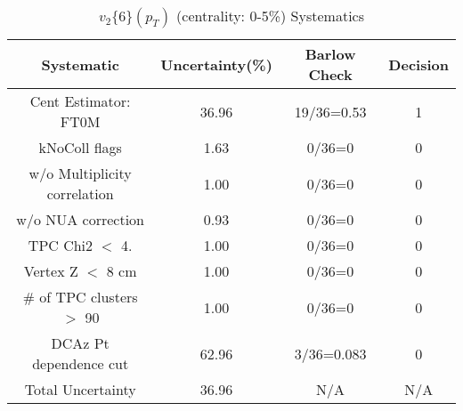 \begin{table}[htbp]
\caption{$v_2\{6\}(p_{T})$ (centrality: 0-5\%) Systematics}
\label{tab:Sys_pTDiffv26ChFull}
\centering
\begin{tabular}{|c|c|c|c|}
\hline
Systematic & Uncertainty(\%) & Barlow Check & Decision \\
\hline
Cent Estimator: FT0M & 36.96 & 19/36=0.53 & 1 \\
kNoColl flags & 1.63 & 0/36=0 & 0 \\
w/o Multiplicity correlation & 1.00 & 0/36=0 & 0 \\
w/o NUA correction & 0.93 & 0/36=0 & 0 \\
TPC Chi2 $<$ 4. & 1.00 & 0/36=0 & 0 \\
Vertex Z $<$ 8 cm & 1.00 & 0/36=0 & 0 \\
\# of TPC clusters $>$ 90 & 1.00 & 0/36=0 & 0 \\
DCAz Pt dependence cut & 62.96 & 3/36=0.083 & 0 \\
\hline
Total Uncertainty & 36.96 & N/A & N/A \\
\hline
\end{tabular}
\end{table}
